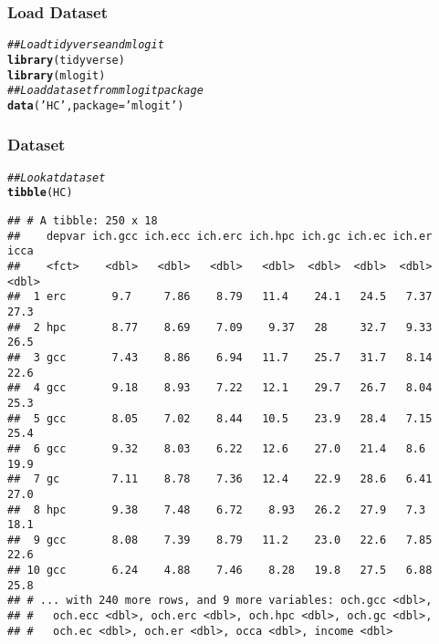 \documentclass{beamer}\usepackage[]{graphicx}\usepackage[]{xcolor}
\makeatletter
\newcommand{\hlstr}[1]{\textcolor[rgb]{0.192,0.494,0.8}{#1}}%
\newcommand{\hlcom}[1]{\textcolor[rgb]{0.678,0.584,0.686}{\textit{#1}}}%
\newcommand{\hlstd}[1]{\textcolor[rgb]{0.345,0.345,0.345}{#1}}%
\newcommand{\hlkwc}[1]{\textcolor[rgb]{0.333,0.667,0.333}{#1}}%
\newcommand{\hlkwd}[1]{\textcolor[rgb]{0.737,0.353,0.396}{\textbf{#1}}}%
\newenvironment{kframe}{%
 \def\at@end@of@kframe{}%
 \ifinner\ifhmode%
  \def\at@end@of@kframe{\end{minipage}}%
  \begin{minipage}{\columnwidth}%
 \fi\fi%
 \def\FrameCommand##1{\hskip\@totalleftmargin \hskip-\fboxsep
 \colorbox{shadecolor}{##1}\hskip-\fboxsep
     \hskip-\linewidth \hskip-\@totalleftmargin \hskip\columnwidth}%
 \MakeFramed {\advance\hsize-\width
   \@totalleftmargin\z@ \linewidth\hsize
   \@setminipage}}%
 {\par\unskip\endMakeFramed%
 \at@end@of@kframe}
\newenvironment{knitrout}{}{} %
\makeatother
\begin{document}
\begin{frame}[fragile]\frametitle{Load Dataset}
\begin{knitrout}\footnotesize
{}\color{fgcolor}\begin{kframe}
\begin{alltt}
\hlcom{## Load tidyverse and mlogit}
\hlkwd{library}\hlstd{(tidyverse)}
\hlkwd{library}\hlstd{(mlogit)}
\hlcom{## Load dataset from mlogit package}
\hlkwd{data}\hlstd{(}\hlstr{'HC'}\hlstd{,} \hlkwc{package} \hlstd{=} \hlstr{'mlogit'}\hlstd{)}
\end{alltt}
\end{kframe}
\end{knitrout}
\end{frame}

\begin{frame}[fragile]\frametitle{Dataset}
\begin{knitrout}\footnotesize
{}\color{fgcolor}\begin{kframe}
\begin{alltt}
\hlcom{## Look at dataset}
\hlkwd{tibble}\hlstd{(HC)}
\end{alltt}
\begin{verbatim}
## # A tibble: 250 x 18
##    depvar ich.gcc ich.ecc ich.erc ich.hpc ich.gc ich.ec ich.er  icca
##    <fct>    <dbl>   <dbl>   <dbl>   <dbl>  <dbl>  <dbl>  <dbl> <dbl>
##  1 erc       9.7     7.86    8.79   11.4    24.1   24.5   7.37  27.3
##  2 hpc       8.77    8.69    7.09    9.37   28     32.7   9.33  26.5
##  3 gcc       7.43    8.86    6.94   11.7    25.7   31.7   8.14  22.6
##  4 gcc       9.18    8.93    7.22   12.1    29.7   26.7   8.04  25.3
##  5 gcc       8.05    7.02    8.44   10.5    23.9   28.4   7.15  25.4
##  6 gcc       9.32    8.03    6.22   12.6    27.0   21.4   8.6   19.9
##  7 gc        7.11    8.78    7.36   12.4    22.9   28.6   6.41  27.0
##  8 hpc       9.38    7.48    6.72    8.93   26.2   27.9   7.3   18.1
##  9 gcc       8.08    7.39    8.79   11.2    23.0   22.6   7.85  22.6
## 10 gcc       6.24    4.88    7.46    8.28   19.8   27.5   6.88  25.8
## # ... with 240 more rows, and 9 more variables: och.gcc <dbl>,
## #   och.ecc <dbl>, och.erc <dbl>, och.hpc <dbl>, och.gc <dbl>,
## #   och.ec <dbl>, och.er <dbl>, occa <dbl>, income <dbl>
\end{verbatim}
\end{kframe}
\end{knitrout}
\end{frame}
\end{document}
